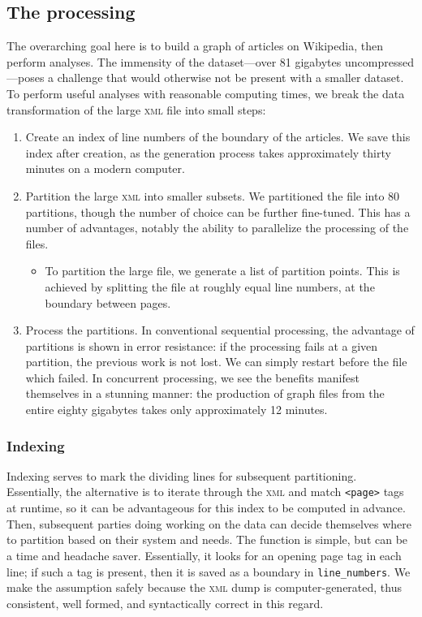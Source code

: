 \documentclass[fontsize=12pt]{article}
\begin{document}
\begin{multicols}{2}
    \subsection{The processing}
    The overarching goal here is to build a graph of articles on Wikipedia, then perform analyses. The immensity of the dataset---over 81 gigabytes uncompressed---poses a challenge that would otherwise not be present with a smaller dataset. To perform useful analyses with reasonable computing times, we break the data transformation of the large \textsc{xml} file into small steps: \begin{enumerate}
        \item Create an index of line numbers of the boundary of the articles. We save this index after creation, as the generation process takes approximately thirty minutes on a modern computer.
        \item Partition the large \textsc{xml} into smaller subsets. We partitioned the file into 80 partitions, though the number of choice can be further fine-tuned. This has a number of advantages, notably the ability to parallelize the processing of the files. \begin{itemize}
            \item To partition the large file, we generate a list of partition points. This is achieved by splitting the file at roughly equal line numbers, at the boundary between pages.
        \end{itemize}
        \item Process the partitions. In conventional sequential processing, the advantage of partitions is shown in error resistance: if the processing fails at a given partition, the previous work is not lost. We can simply restart before the file which failed. In concurrent processing, we see the benefits manifest themselves in a stunning manner: the production of graph files from the entire eighty gigabytes takes only approximately 12 minutes. 
    \end{enumerate}
    \subsubsection{Indexing}
    Indexing serves to mark the dividing lines for subsequent partitioning. Essentially, the alternative is to iterate through the \textsc{xml} and match \texttt{<page>} tags at runtime, so it can be advantageous for this index to be computed in advance. Then, subsequent parties doing working on the data can decide themselves where to partition based on their system and needs.
    The function is simple, but can be a time and headache saver. Essentially, it looks for an opening page tag in each line; if such a tag is present, then it is saved as a boundary in \texttt{line\_numbers}. We make the assumption safely because the \textsc{xml} dump is computer-generated, thus consistent, well formed, and syntactically correct in this regard.


\end{multicols}
\end{document}

